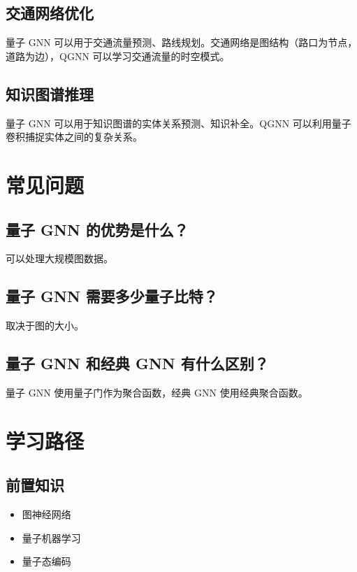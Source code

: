 \documentclass[12pt,a4paper]{article}
\begin{document}
\subsection{交通网络优化}

量子 GNN 可以用于交通流量预测、路线规划。交通网络是图结构（路口为节点，道路为边），QGNN 可以学习交通流量的时空模式。

\subsection{知识图谱推理}

量子 GNN 可以用于知识图谱的实体关系预测、知识补全。QGNN 可以利用量子卷积捕捉实体之间的复杂关系。

\section{常见问题}

\subsection{量子 GNN 的优势是什么？}

可以处理大规模图数据。

\subsection{量子 GNN 需要多少量子比特？}

取决于图的大小。

\subsection{量子 GNN 和经典 GNN 有什么区别？}

量子 GNN 使用量子门作为聚合函数，经典 GNN 使用经典聚合函数。

\section{学习路径}

\subsection{前置知识}
\begin{itemize}
  \item 图神经网络
  \item 量子机器学习
  \item 量子态编码
\end{itemize}
\end{document}
